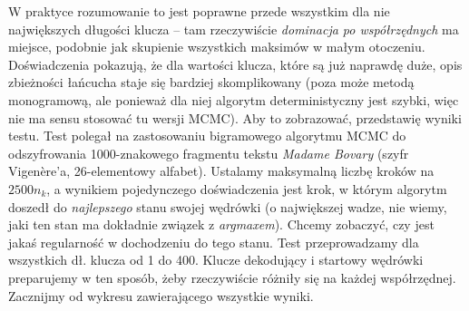 \documentclass[a4paper]{article}
\theoremstyle{defn}
\theoremstyle{theorem}
\theoremstyle{lemma}
\theoremstyle{cor}
\theoremstyle{fact}
\begin{document}
W praktyce rozumowanie to jest poprawne przede wszystkim dla nie największych długości klucza – tam rzeczywiście \textit{dominacja po współrzędnych} ma miejsce, podobnie jak skupienie wszystkich maksimów w małym otoczeniu. Doświadczenia pokazują, że dla wartości klucza, które są już naprawdę duże, opis zbieżności łańcucha staje się bardziej skomplikowany (poza może metodą monogramową, ale ponieważ dla niej algorytm deterministyczny jest szybki, więc nie ma sensu stosować tu wersji MCMC). Aby to zobrazować, przedstawię wyniki testu. Test polegał na zastosowaniu bigramowego algorytmu MCMC do odszyfrowania 1000-znakowego fragmentu tekstu  \textit{Madame Bovary} \cite{gutenberg} (szyfr Vigenère'a, 26-elementowy alfabet). Ustalamy maksymalną liczbę kroków na $2500n_k$, a wynikiem pojedynczego doświadczenia jest krok, w którym algorytm doszedł do \textit{najlepszego} stanu swojej wędrówki (o największej wadze, nie wiemy, jaki ten stan ma dokładnie związek z \textit{argmaxem}). Chcemy zobaczyć, czy jest jakaś regularność w dochodzeniu do tego stanu. Test przeprowadzamy dla wszystkich dł. klucza od 1 do 400. Klucze dekodujący i startowy wędrówki preparujemy w ten sposób, żeby rzeczywiście różniły się na każdej współrzędnej. Zacznijmy od wykresu zawierającego wszystkie wyniki.
\end{document}

